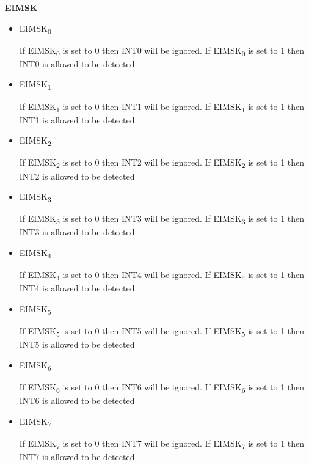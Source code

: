 \documentclass[12pt,letterpaper]{article}
\begin{document}
\begin{enumerate}
\begin{itemize}
		
		\end{itemize}


	\textbf{EIMSK}

		\begin{itemize}
			\item
			EIMSK\textsubscript{0}
				
			If EIMSK\textsubscript{0} is set to 0 then INT0 will be ignored.
			If EIMSK\textsubscript{0} is set to 1 then INT0 is allowed to be detected
			
			\item 
			EIMSK\textsubscript{1}
			
			If EIMSK\textsubscript{1} is set to 0 then INT1 will be ignored.
			If EIMSK\textsubscript{1} is set to 1 then INT1 is allowed to be detected
			
			\item
			EIMSK\textsubscript{2}
			
			If EIMSK\textsubscript{2} is set to 0 then INT2 will be ignored.
			If EIMSK\textsubscript{2} is set to 1 then INT2 is allowed to be detected
			
			\item 
			EIMSK\textsubscript{3}
			
			If EIMSK\textsubscript{3} is set to 0 then INT3 will be ignored.
			If EIMSK\textsubscript{3} is set to 1 then INT3 is allowed to be detected
			
			
			\item
			EIMSK\textsubscript{4}
			
			If EIMSK\textsubscript{4} is set to 0 then INT4 will be ignored.
			If EIMSK\textsubscript{4} is set to 1 then INT4 is allowed to be detected
			
			\item 
			EIMSK\textsubscript{5}
			
			If EIMSK\textsubscript{5} is set to 0 then INT5 will be ignored.
			If EIMSK\textsubscript{5} is set to 1 then INT5 is allowed to be detected
			
			\item
			EIMSK\textsubscript{6}
			
			If EIMSK\textsubscript{6} is set to 0 then INT6 will be ignored.
			If EIMSK\textsubscript{6} is set to 1 then INT6 is allowed to be detected
			
			
			\item
			EIMSK\textsubscript{7}
			
			If EIMSK\textsubscript{7} is set to 0 then INT7 will be ignored.
			If EIMSK\textsubscript{7} is set to 1 then INT7 is allowed to be detected
			

\end{itemize}
\end{enumerate}
\end{document}
